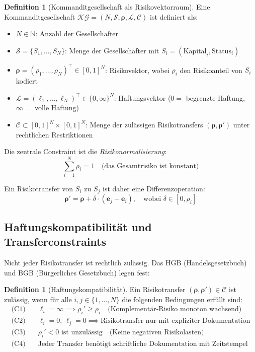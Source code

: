 \documentclass[a4paper, 12pt, twoside, openright]{report}
\theoremstyle{definition}
\newtheorem{definition}[theorem]{Definition}
\theoremstyle{definition}
\begin{document}
\begin{definition}[Kommanditgesellschaft als Risikovektorraum]
Eine Kommanditgesellschaft $\mathcal{KG} = (N, \mathcal{S}, \boldsymbol{\rho}, \mathcal{L}, \mathcal{C})$ ist definiert als:
\begin{itemize}
    \item $N \in \mathbb{N}$: Anzahl der Gesellschafter
    \item $\mathcal{S} = \{S_1, \ldots, S_N\}$: Menge der Gesellschafter mit $S_i = (\text{Kapital}_i, \text{Status}_i)$
    \item $\boldsymbol{\rho} = (\rho_1, \ldots, \rho_N)^{\top} \in [0,1]^N$: Risikovektor, wobei $\rho_i$ den Risikoanteil von $S_i$ kodiert
    \item $\mathcal{L} = (\ell_1, \ldots, \ell_N)^{\top} \in \{0, \infty\}^N$: Haftungsvektor ($0 = $ begrenzte Haftung, $\infty = $ volle Haftung)
    \item $\mathcal{C} \subset [0,1]^N \times [0,1]^N$: Menge der zulässigen Risikotransfers $({\boldsymbol{\rho}}, {\boldsymbol{\rho}}')$ unter rechtlichen Restriktionen
\end{itemize}
\end{definition}

Die zentrale Constraint ist die \emph{Risikonormalisierung}:
\begin{equation}
\sum_{i=1}^N \rho_i = 1 \quad \text{(das Gesamtrisiko ist konstant)}
\end{equation}

Ein Risikotransfer von $S_i$ zu $S_j$ ist daher eine Differenzoperation:
\begin{equation}
\boldsymbol{\rho}' = \boldsymbol{\rho} + \delta \cdot (\mathbf{e}_j - \mathbf{e}_i), \quad \text{wobei } \delta \in [0, \rho_i]
\end{equation}

\subsection{Haftungskompatibilität und Transferconstraints}

Nicht jeder Risikotransfer ist rechtlich zulässig. Das HGB (Handelsgesetzbuch) und BGB (Bürgerliches Gesetzbuch) legen fest:

\begin{definition}[Haftungskompatibilität]
Ein Risikotransfer $({\boldsymbol{\rho}}, {\boldsymbol{\rho}}') \in \mathcal{C}$ ist zulässig, wenn für alle $i,j \in \{1,\ldots,N\}$ die folgenden Bedingungen erfüllt sind:
\begin{align}
\text{(C1)} \quad &\ell_i = \infty \implies \rho_i' \geq \rho_i \quad \text{(Komplementär-Risiko monoton wachsend)}\\
\text{(C2)} \quad &\ell_i = 0, \, \ell_j = 0 \implies \text{Risikotransfer nur mit expliziter Dokumentation}\\
\text{(C3)} \quad &\rho_i' < 0 \text{ ist unzulässig} \quad \text{(Keine negativen Risikolasten)}\\
\text{(C4)} \quad &\text{Jeder Transfer benötigt schriftliche Dokumentation mit Zeitstempel}
\end{align}
\end{definition}
\end{document}
